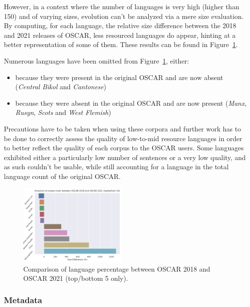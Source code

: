 However, in a context where the number of languages is very high (higher than 150) and of varying sizes, evolution can't be analyzed via a mere size evaluation. By computing, for each language, the relative size difference between the 2018 and 2021 releases of OSCAR, less resourced languages do appear, hinting at a better representation of some of them. These results can be found in Figure~\ref{fig:lang-size-pctg}.

Numerous languages have been omitted from Figure~\ref{fig:lang-size-pctg}, either:
\begin{itemize}
    \item because they were present in the original OSCAR and are now absent (\textit{Central Bikol} and \textit{Cantonese})
    \item because they were absent in the original OSCAR and are now present (\textit{Manx}, \textit{Rusyn}, \textit{Scots} and \textit{West Flemish})
\end{itemize}

Precautions have to be taken when using these corpora and further work has to be done to correctly assess the quality of low-to-mid resource languages in order to better reflect the quality of each corpus to the OSCAR users. Some languages exhibited either a particularly low number of sentences or a very low quality, and as such couldn't be usable, while still accounting for a language in the total language count of the original OSCAR.

\begin{figure}[ht]
    \includegraphics[width=0.48\textwidth, angle=0]{static/media/data/ungoliant/size_evo_pctg}
    \caption{Comparison of language percentage between OSCAR 2018 and OSCAR 2021 (top/bottom 5 only).}
    \label{fig:lang-size-pctg}
\end{figure}

\subsubsection{Metadata}

